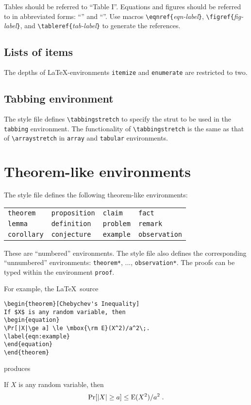 \documentclass{DIKU-report}[2006/05/09]
\begin{document}
Tables should be referred to ``Table I''.  Equations and figures
should be referred to in abbreviated forms: ``''
and ``''.  Use macros
\verb|\eqnref{|\emph{eqn-label}\verb|}|,
\verb|\figref{|\emph{fig-label}\verb|}|, and
\verb|\tableref{|\emph{tab-label}\verb|}| to generate the references.

\subsection{Lists of items}

The depths of \LaTeX-environments \verb|itemize| and \verb|enumerate|
are restricted to two.

\subsection{Tabbing environment}

The style file defines \verb|\tabbingstretch| to specify the strut
to be used in the \texttt{tabbing} environment. The functionality of
\verb|\tabbingstretch| is the same as that of \verb|\arraystretch|
in \texttt{array} and \texttt{tabular} environments.

\section{Theorem-like environments}

The style file defines the following theorem-like environments:
\begin{center}
\begin{tabular}{llll}
\verb|theorem|	& \verb|proposition|	& \verb|claim|	& \verb|fact| \\

\verb|lemma|	& \verb|definition|	& \verb|problem|& \verb|remark| \\

\verb|corollary|& \verb|conjecture|	& \verb|example|&  \verb|observation|
\end{tabular}
\end{center}
These are ``numbered'' environments.  The style file also defines the
corresponding ``unnumbered'' environments: \verb|theorem*|, ...,
\verb|observation*|.  The proofs can be typed within the environment
\verb|proof|.

For example, the \LaTeX\ source
\begin{verbatim}
\begin{theorem}[Chebychev's Inequality]
If $X$ is any random variable, then
\begin{equation}
\Pr[|X|\ge a] \le \mbox{\rm E}(X^2)/a^2\;.
\label{eqn:example}
\end{equation}
\end{theorem}
\end{verbatim}
produces
\begin{theorem}
If $X$ is any random variable, then
\begin{equation}
\Pr[|X|\ge a] \le \mbox{\rm E}(X^2)/a^2\;.
\label{eqn:example}
\end{equation}
\end{theorem}
\end{document}
